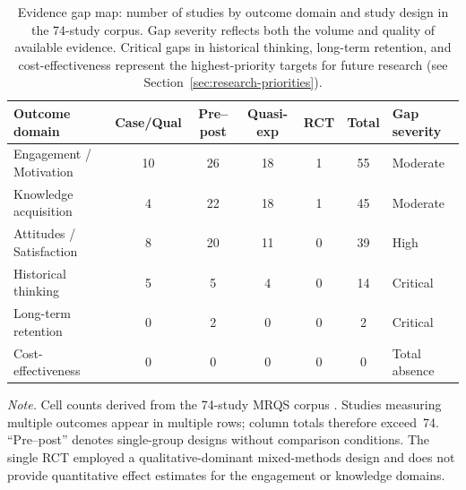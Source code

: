 \begin{table}[!h]
\centering
\caption{Evidence gap map: number of studies by outcome domain and study design in the 74-study corpus. Gap severity reflects both the volume and quality of available evidence. Critical gaps in historical thinking, long-term retention, and cost-effectiveness represent the highest-priority targets for future research (see Section~\ref{sec:research-priorities}).}
\label{tab:evidence-gap-map}
\small
\begin{tabular}{@{}lcccccp{2.8cm}@{}}
\toprule
\textbf{Outcome domain} & \textbf{Case/Qual} & \textbf{Pre--post} & \textbf{Quasi-exp} & \textbf{RCT} & \textbf{Total} & \textbf{Gap severity} \\
\midrule
Engagement / Motivation & 10 & 26 & 18 & 1 & 55 & Moderate \\
Knowledge acquisition   &  4 & 22 & 18 & 1 & 45 & Moderate \\
Attitudes / Satisfaction &  8 & 20 & 11 & 0 & 39 & High \\
Historical thinking     &  5 &  5 &  4 & 0 & 14 & Critical \\
Long-term retention     &  0 &  2 &  0 & 0 &  2 & Critical \\
Cost-effectiveness      &  0 &  0 &  0 & 0 &  0 & Total absence \\
\bottomrule
\end{tabular}

\smallskip
\noindent\textit{Note.} Cell counts derived from the 74-study MRQS corpus \cite{Korniienko2025mrqs}. Studies measuring multiple outcomes appear in multiple rows; column totals therefore exceed~74. ``Pre--post'' denotes single-group designs without comparison conditions. The single RCT employed a qualitative-dominant mixed-methods design and does not provide quantitative effect estimates for the engagement or knowledge domains.
\end{table}


